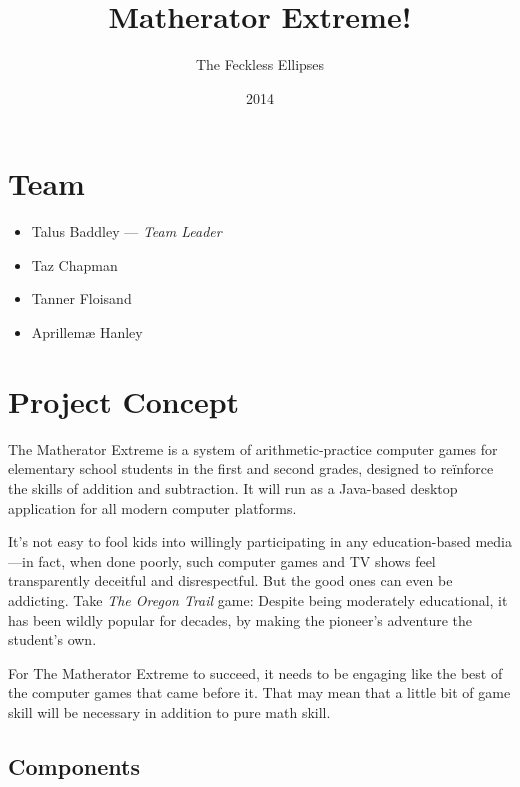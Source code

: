 \documentclass[11pt,a4paper,twoside]{report}
\title{Matherator Extreme!}
\author{The Feckless Ellipses}
\date{2014}
\begin{document}
\maketitle{}






\chapter{Team}

\begin{itemize}
    \item Talus Baddley — \textit{Team Leader}
    \item Taz Chapman
    \item Tanner Floisand
    \item Aprillemæ Hanley
\end{itemize}






\tableofcontents






\chapter{Project Concept}

The Matherator Extreme is a system of arithmetic-practice computer games for elementary school students in the first and second grades, designed to reïnforce the skills of addition and subtraction. It will run as a Java-based desktop application for all modern computer platforms.

It’s not easy to fool kids into willingly participating in any education-based media—in fact, when done poorly, such computer games and TV shows feel transparently deceitful and disrespectful. But the good ones can even be addicting. Take \textit{The Oregon Trail} game: Despite being moderately educational, it has been wildly popular for decades, by making the pioneer’s adventure the student’s own.

For The Matherator Extreme to succeed, it needs to be engaging like the best of the computer games that came before it. That may mean that a little bit of game skill will be necessary in addition to pure math skill.


\section{Components}
\end{document}

